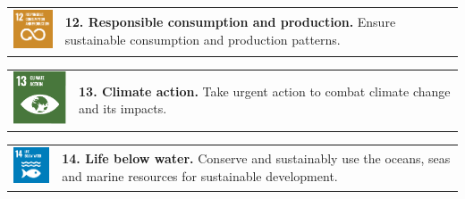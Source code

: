 \begin{multicols}{2}
    \noindent
    \begin{tabular}{p{25mm} p{46mm}}
        \vspace{0mm} \includegraphics[width=2cm]{text/appendix/appendix-sdg/resources/sdg12.pdf} & \vspace{-0.5mm} \textbf{12. Responsible consumption and production.} Ensure sustainable consumption and production patterns. \\
    \end{tabular}

    \noindent
    \begin{tabular}{p{25mm} p{46mm}}
        \vspace{0mm} \includegraphics[width=2cm]{text/appendix/appendix-sdg/resources/sdg13.pdf} & \vspace{-0.5mm} \textbf{13. Climate action.} Take urgent action to combat climate change and its impacts.  \\
    \end{tabular}

    \noindent
    \begin{tabular}{p{25mm} p{46mm}}
        \vspace{0mm} \includegraphics[width=2cm]{text/appendix/appendix-sdg/resources/sdg14.pdf} & \vspace{-0.5mm} \textbf{14. Life below water.} Conserve and sustainably use the oceans, seas and marine resources for sustainable development. \\
    \end{tabular}

\end{multicols}


    \newpage


